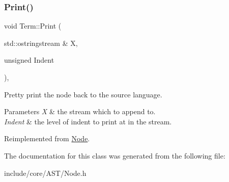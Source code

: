 \subsubsection{\texorpdfstring{Print()}{Print()}}
{\footnotesize\ttfamily void Term\+::\+Print (\begin{DoxyParamCaption}\item[{std\+::ostringstream \&}]{X,  }\item[{unsigned}]{Indent }\end{DoxyParamCaption})\hspace{0.3cm}{\ttfamily [override]}, {\ttfamily [virtual]}}

Pretty print the node back to the source language. 
\begin{DoxyParams}{Parameters}
{\em X} & the stream which to append to. \\
\hline
{\em Indent} & the level of indent to print at in the stream. \\
\hline
\end{DoxyParams}


Reimplemented from \mbox{\hyperlink{class_node_a5325b760a6e6fe94227c0cff53af2c45}{Node}}.



The documentation for this class was generated from the following file\+:\begin{DoxyCompactItemize}
\item 
include/core/\+A\+S\+T/Node.\+h\end{DoxyCompactItemize}
